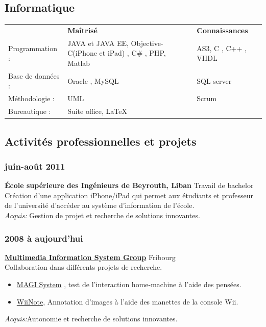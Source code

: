 \documentclass[12pt,a4paper,twoside]{report}
\begin{document}
\subsection{Informatique}
\vspace{-0.4cm}
\begin{tabular}[t]{lp{5.5cm}l}
 & \textbf{Maîtrisé} & \textbf{Connaissances} \\
 Programmation : &  JAVA et JAVA EE, Objective-C(iPhone et iPad) , C\# , PHP, Matlab &  AS3,   C , C++ , VHDL\\ 
 Base de données : &  Oracle , MySQL&  SQL server \\
Méthodologie : & UML & Scrum \\
Bureautique : & Suite office, \LaTeX & \\
\end{tabular}

\subsection{Activités professionnelles et projets  }
\vspace{-0.4cm}
\subsubsection{juin-août 2011}
\vspace{-0.4cm}
\textbf{École supérieure des Ingénieurs de Beyrouth, Liban }Travail de bachelor \\
Création d'une application iPhone/iPad qui permet aux étudiants et professeur de l'université  d'accéder au système d'information de l'école.\\
\textit{Acquis:} Gestion de projet et recherche de solutions innovantes.
\vspace{-0.2cm}
\subsubsection{2008 à aujourd'hui}
\vspace{-0.4cm}
\textbf{\href{http://www.misg.ch/}{Multimedia  Information System Group} }Fribourg\\
Collaboration dans différents projets de recherche.
\begin{itemize}
\item \href{http://magisystem.project.eia-fr.ch/}{MAGI System} , test de l'interaction home-machine à l'aide des pensées.
\item \href{http://portal.acm.org/citation.cfm?id=1647363}{WiiNote}, Annotation d'images à l'aide des manettes de la console Wii. 
\end{itemize}
\textit{Acquis:}Autonomie et recherche de solutions innovantes.
\vspace{-0.2cm}
\end{document}
